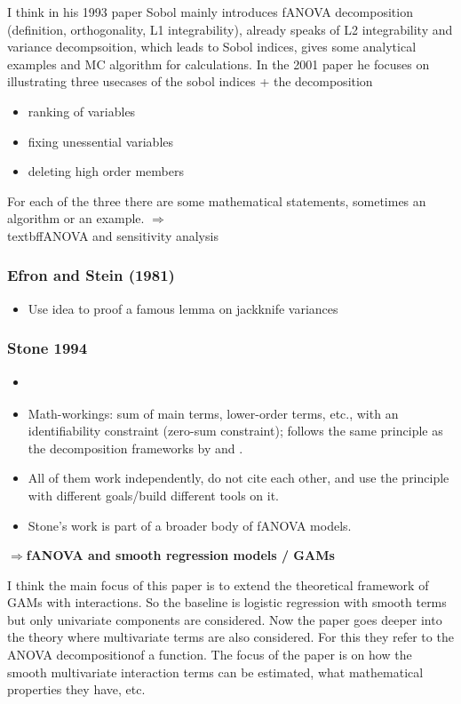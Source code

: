 I think in his 1993 paper Sobol mainly introduces fANOVA decomposition (definition, orthogonality, L1 integrability), already speaks of L2 integrability and variance decompsoition, which leads to Sobol indices, gives some analytical examples and MC algorithm for calculations.
In the 2001 paper he focuses on illustrating three usecases of the sobol indices + the decomposition\par
\begin{itemize}
    \item ranking of variables
    \item fixing unessential variables
    \item deleting high order members
\end{itemize}
For each of the three there are some mathematical statements, sometimes an algorithm or an example.
$\Rightarrow$\\textbf{fANOVA and sensitivity analysis}

\subsubsection*{Efron and Stein (1981)}
\begin{itemize}
    \item Use idea to proof a famous lemma on jackknife variances \citep{efron1981}
\end{itemize}

\subsubsection*{Stone 1994}
\begin{itemize}
    \item \cite{stone1994}
    \item Math-workings: sum of main terms, lower-order terms, etc., with an identifiability constraint (zero-sum constraint); follows the same principle as the decomposition frameworks by \cite{hoeffding1948} and \cite{sobol2001}.
    \item All of them work independently, do not cite each other, and use the principle with different goals/build different tools on it.
    \item Stone's work is part of a broader body of fANOVA models.
\end{itemize}
$\Rightarrow$\textbf{fANOVA and smooth regression models / GAMs}\par
I think the main focus of this paper is to extend the theoretical framework of GAMs with interactions. So the baseline is logistic regression with smooth terms but only univariate components are considered.
Now the paper goes deeper into the theory where multivariate terms are also considered. For this they refer to the \ldq ANOVA decomposition\rdq of a function. The focus of the paper is on how the smooth multivariate interaction terms can be estimated, what mathematical properties they have, etc.


